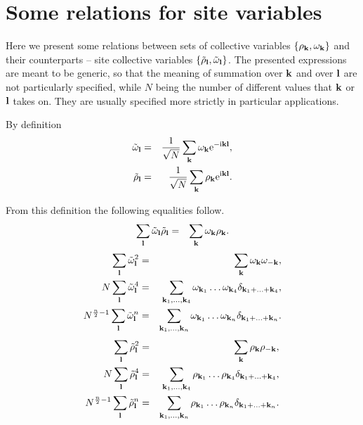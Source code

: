 \section{\label{sec:app-b} Some relations for site variables}

Here we present some relations between sets of collective variables $\{\rho_{\vb k}, \omega_{\vb k}\}$ and their counterparts -- site collective variables $\{\tilde{\rho}_{\vb l}, \tilde{\omega}_{\vb l}\}$. The presented expressions are meant to be generic, so that the meaning of summation over $\vb k$ and over $\vb l$ are not particularly specified, while $N$ being the number of different values that $\vb k$ or $\vb l$ takes on. They are usually specified more strictly in particular applications.

By definition
\begin{eqnarray*}
	\tilde{\omega}_{\vb l} & = & \frac{1}{\sqrt{N}} \sum_{\vb k} \omega_{\vb k} {\rm e}^{-{\rm i}{\vb k}{\vb l}},
\\
	\tilde{\rho}_{\vb l} & = & \frac{1}{\sqrt{N}} \sum_{\vb k} \rho_{\vb k} {\rm e}^{{\rm i} {\vb k} {\vb l}}.
\end{eqnarray*}

From this definition the following equalities follow.
\begin{eqnarray*}
	\sum_{\vb l} \tilde{\omega}_{\vb l} \tilde{\rho}_{\vb l} & = & \sum_{\vb k} \omega_{\vb k} \rho_{\vb k}.
\end{eqnarray*}
\begin{eqnarray*}
	\sum_{\vb l} \tilde{\omega}_{\vb l}^2 & = & \sum_{\vb k} \omega_{\vb k} \omega_{-\vb k},
\\
	N \sum_{\vb l} \tilde{\omega}_{\vb l}^4 & = & \sum_{\vb k_1, \dotsc, \vb k_4} \omega_{\vb k_1} \dotsc \omega_{\vb k_4} \delta_{\vb{k}_1 + \dotsc + \vb{k}_4},
\\
	N^{\frac{n}{2} - 1} \sum_{\vb l} \tilde{\omega}_{\vb l}^n & = &  \sum_{\vb k_1, \dotsc, \vb k_n} \omega_{\vb k_1} \dotsc \omega_{\vb k_n} \delta_{\vb{k}_1 + \dotsc + \vb{k}_n}.
\end{eqnarray*}
\begin{eqnarray*}
	\sum_{\vb l} \tilde{\rho}_{\vb l}^2 & = & \sum_{\vb k} \rho_{\vb k} \rho_{-\vb k},
\\
	N \sum_{\vb l} \tilde{\rho}_{\vb l}^4 & = & \sum_{\vb k_1, \dotsc, \vb k_4} \rho_{\vb k_1} \dotsc \rho_{\vb k_4} \delta_{\vb{k}_1 + \dotsc + \vb{k}_4},
\\
	N^{\frac{n}{2} - 1} \sum_{\vb l} \tilde{\rho}_{\vb l}^n & = & \sum_{\vb k_1, \dotsc, \vb k_n} \rho_{\vb k_1} \dotsc \rho_{\vb k_n} \delta_{\vb{k}_1 + \dotsc + \vb{k}_n}.
\end{eqnarray*}